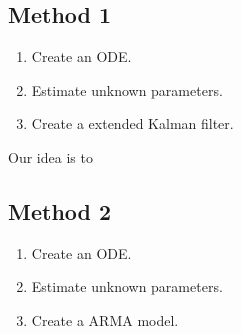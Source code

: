 \subsection*{Method 1}
\begin{enumerate}
	\item Create an ODE.
	\item Estimate unknown parameters.
	\item Create a extended Kalman filter.
\end{enumerate}
Our idea is to
\subsection*{Method 2}
\begin{enumerate}
	\item Create an ODE.
	\item Estimate unknown parameters.
	\item Create a ARMA model.
\end{enumerate}